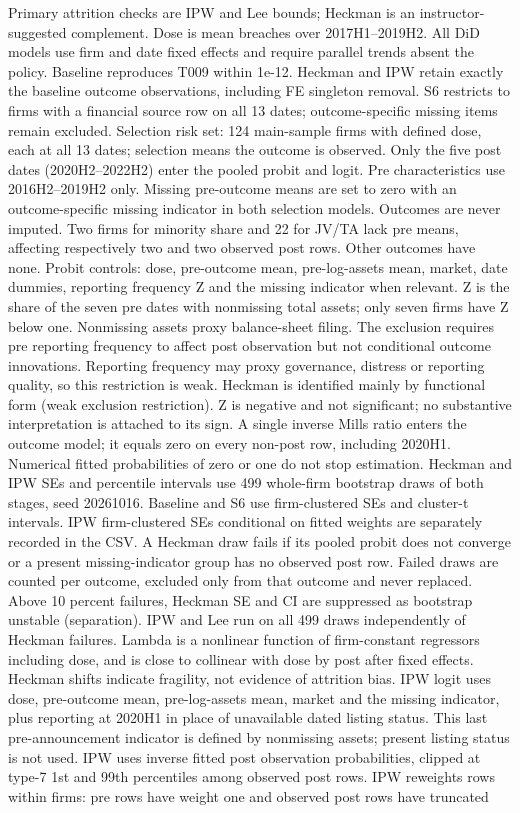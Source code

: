 \noindent\begin{minipage}{\linewidth}\footnotesize
Primary attrition checks are IPW and Lee bounds; Heckman is an instructor-suggested complement. Dose is mean breaches over 2017H1--2019H2. All DiD models use firm and date fixed effects and require parallel trends absent the policy. Baseline reproduces T009 within 1e-12. Heckman and IPW retain exactly the baseline outcome observations, including FE singleton removal. S6 restricts to firms with a financial source row on all 13 dates; outcome-specific missing items remain excluded. Selection risk set: 124 main-sample firms with defined dose, each at all 13 dates; selection means the outcome is observed. Only the five post dates (2020H2--2022H2) enter the pooled probit and logit. Pre characteristics use 2016H2--2019H2 only. Missing pre-outcome means are set to zero with an outcome-specific missing indicator in both selection models. Outcomes are never imputed. Two firms for minority share and 22 for JV/TA lack pre means, affecting respectively two and two observed post rows. Other outcomes have none. Probit controls: dose, pre-outcome mean, pre-log-assets mean, market, date dummies, reporting frequency Z and the missing indicator when relevant. Z is the share of the seven pre dates with nonmissing total assets; only seven firms have Z below one. Nonmissing assets proxy balance-sheet filing. The exclusion requires pre reporting frequency to affect post observation but not conditional outcome innovations. Reporting frequency may proxy governance, distress or reporting quality, so this restriction is weak. Heckman is identified mainly by functional form (weak exclusion restriction). Z is negative and not significant; no substantive interpretation is attached to its sign. A single inverse Mills ratio enters the outcome model; it equals zero on every non-post row, including 2020H1. Numerical fitted probabilities of zero or one do not stop estimation. Heckman and IPW SEs and percentile intervals use 499 whole-firm bootstrap draws of both stages, seed 20261016. Baseline and S6 use firm-clustered SEs and cluster-t intervals. IPW firm-clustered SEs conditional on fitted weights are separately recorded in the CSV. A Heckman draw fails if its pooled probit does not converge or a present missing-indicator group has no observed post row. Failed draws are counted per outcome, excluded only from that outcome and never replaced. Above 10 percent failures, Heckman SE and CI are suppressed as bootstrap unstable (separation). IPW and Lee run on all 499 draws independently of Heckman failures. Lambda is a nonlinear function of firm-constant regressors including dose, and is close to collinear with dose by post after fixed effects. Heckman shifts indicate fragility, not evidence of attrition bias. IPW logit uses dose, pre-outcome mean, pre-log-assets mean, market and the missing indicator, plus reporting at 2020H1 in place of unavailable dated listing status. This last pre-announcement indicator is defined by nonmissing assets; present listing status is not used. IPW uses inverse fitted post observation probabilities, clipped at type-7 1st and 99th percentiles among observed post rows. IPW reweights rows within firms: pre rows have weight one and observed post rows have truncated 
\end{minipage}
